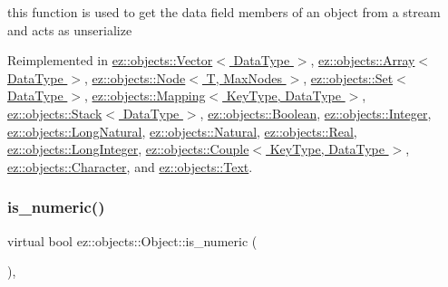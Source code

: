 this function is used to get the data field members of an object from a stream and acts as unserialize 

Reimplemented in \hyperlink{classez_1_1objects_1_1Vector_af89b5f0546a049c7ade93d48eb84fa6b}{ez\+::objects\+::\+Vector$<$ Data\+Type $>$}, \hyperlink{classez_1_1objects_1_1Array_a438c2c6187dd5cce0dae9f303b34609c}{ez\+::objects\+::\+Array$<$ Data\+Type $>$}, \hyperlink{classez_1_1objects_1_1Node_a637eb76e0f2597e92c5f827b80bff0ca}{ez\+::objects\+::\+Node$<$ T, Max\+Nodes $>$}, \hyperlink{classez_1_1objects_1_1Set_a338e14cc6fe1afa7031a6f5f4959acf1}{ez\+::objects\+::\+Set$<$ Data\+Type $>$}, \hyperlink{classez_1_1objects_1_1Mapping_ad47e98279b853fd10614a24dc201d92e}{ez\+::objects\+::\+Mapping$<$ Key\+Type, Data\+Type $>$}, \hyperlink{classez_1_1objects_1_1Stack_a3e9796e6bbad1be135c1911e20ec4a8a}{ez\+::objects\+::\+Stack$<$ Data\+Type $>$}, \hyperlink{classez_1_1objects_1_1Boolean_a36f2ae3b2e092b0f6f1d4c0be108e9e3}{ez\+::objects\+::\+Boolean}, \hyperlink{classez_1_1objects_1_1Integer_af465d88d1b132f7131be7b29aadc5a8f}{ez\+::objects\+::\+Integer}, \hyperlink{classez_1_1objects_1_1LongNatural_a37f51f88e9b039b5b59d0392ca03eeb0}{ez\+::objects\+::\+Long\+Natural}, \hyperlink{classez_1_1objects_1_1Natural_ae914aff21b276fbb1e73f48d426cbbc7}{ez\+::objects\+::\+Natural}, \hyperlink{classez_1_1objects_1_1Real_a89711c886a9569409c7d17530b97bcc5}{ez\+::objects\+::\+Real}, \hyperlink{classez_1_1objects_1_1LongInteger_a9fa1d50b8d4d7e2ea2383bb625712349}{ez\+::objects\+::\+Long\+Integer}, \hyperlink{classez_1_1objects_1_1Couple_a4f7228308e803711bd6866c367e18d06}{ez\+::objects\+::\+Couple$<$ Key\+Type, Data\+Type $>$}, \hyperlink{classez_1_1objects_1_1Character_a021f11fd444493316c4d55e6efb031f5}{ez\+::objects\+::\+Character}, and \hyperlink{classez_1_1objects_1_1Text_a4ca781c814cc6c623e4c69ae952c6760}{ez\+::objects\+::\+Text}.

\mbox{\label{classez_1_1objects_1_1Object_a19ba1672d4063232c4619e016ca178f8}} 
\subsubsection{\texorpdfstring{is\+\_\+numeric()}{is\_numeric()}}
{\footnotesize\ttfamily virtual bool ez\+::objects\+::\+Object\+::is\+\_\+numeric (\begin{DoxyParamCaption}{ }\end{DoxyParamCaption})\hspace{0.3cm}{\ttfamily [inline]}, {\ttfamily [virtual]}}

